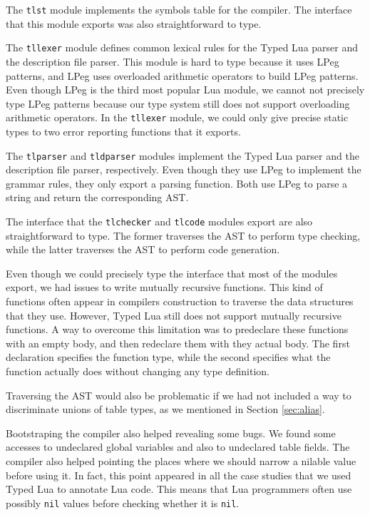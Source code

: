 The \texttt{tlst} module implements the symbols table for the compiler.
The interface that this module exports was also straightforward to type.

The \texttt{tllexer} module defines common lexical rules for
the Typed Lua parser and the description file parser.
This module is hard to type because it uses LPeg \citep{lpeg,ierusalimschy2009lpeg}
patterns, and LPeg uses overloaded arithmetic operators to
build LPeg patterns. 
Even though LPeg is the third most popular Lua module,
we cannot not precisely type LPeg patterns because our
type system still does not support overloading arithmetic
operators.
In the \texttt{tllexer} module, we could only give precise static types
to two error reporting functions that it exports.

The \texttt{tlparser} and \texttt{tldparser} modules implement the Typed Lua
parser and the description file parser, respectively.
Even though they use LPeg to implement the grammar rules,
they only export a parsing function.
Both use LPeg to parse a string and return the corresponding AST.

The interface that the \texttt{tlchecker} and \texttt{tlcode}
modules export are also straightforward to type.
The former traverses the AST to perform type checking,
while the latter traverses the AST to perform code generation.

Even though we could precisely type the interface that most of
the modules export, we had issues to write mutually recursive functions.
This kind of functions often appear in compilers construction
to traverse the data structures that they use.
However, Typed Lua still does not support mutually recursive functions.
A way to overcome this limitation was to predeclare these functions
with an empty body, and then redeclare them with they actual body.
The first declaration specifies the function type, while the
second specifies what the function actually does without changing
any type definition.

Traversing the AST would also be problematic if we had not included
a way to discriminate unions of table types, as we mentioned in Section \ref{sec:alias}.

Bootstraping the compiler also helped revealing some bugs.
We found some accesses to undeclared global variables and also
to undeclared table fields.
The compiler also helped pointing the places where we should narrow
a nilable value before using it.
In fact, this point appeared in all the case studies that we used
Typed Lua to annotate Lua code.
This means that Lua programmers often use possibly \texttt{nil} values
before checking whether it is \texttt{nil}.

